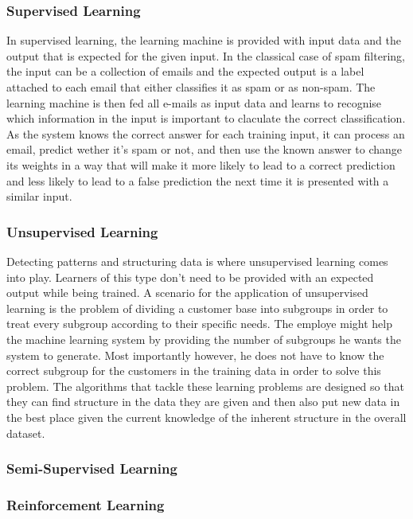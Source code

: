 \documentclass[
			   fontsize=11pt,
               paper=a4,
               bibliography=totoc,
               idxtotoc,
               headsepline,
               footsepline,
               footinclude=false,
               BCOR=12mm,
               DIV=13,
               openany,   %
               ]
               {scrbook}
\begin{document}
\subsubsection{Supervised Learning}
In supervised learning, the learning machine is provided with input data and the output that is expected for the given input. In the classical case of spam filtering, the input can be a collection of emails and the expected output is a label attached to each email that either classifies it as spam or as non-spam. The learning machine is then fed all e-mails as input data and learns to recognise which information in the input is important to claculate the correct classification. As the system knows the correct answer for each training input, it can process an email, predict wether it's spam or not, and then use the known answer to change its weights in a way that will make it more likely to lead to a correct prediction and less likely to lead to a false prediction the next time it is presented with a similar input.

\subsubsection{Unsupervised Learning}
Detecting patterns and structuring data is where unsupervised learning comes into play. Learners of this type don't need to be provided with an expected output while being trained. A scenario for the application of unsupervised learning is the problem of dividing a customer base into subgroups in order to treat every subgroup according to their specific needs. The employe might help the machine learning system by providing the number of subgroups he wants the system to generate. Most importantly however, he does not have to know the correct subgroup for the customers in the training data in order to solve this problem. The algorithms that tackle these learning problems are designed so that they can find structure in the data they are given and then also put new data in the best place given the current knowledge of the inherent structure in the overall dataset.

\subsubsection{Semi-Supervised Learning}

\subsubsection{Reinforcement Learning}
\end{document}
